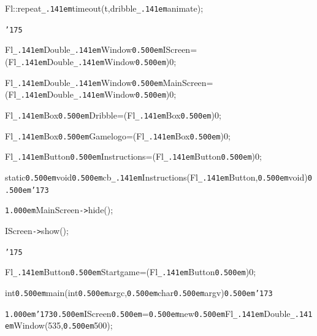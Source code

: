 \documentclass[12pt]{article}
\begin{document}
\noindent
{}Fl::repeat{\tt\_\kern.141em}timeout(t,dribble{\tt\_\kern.141em}animate);

\noindent
{}{\tt\char'175}

\noindent
{}\hfill

\noindent
{}Fl{\tt\_\kern.141em}Double{\tt\_\kern.141em}Window{\tt\mc \kern0.500em}{\tt *}IScreen=(Fl{\tt\_\kern.141em}Double{\tt\_\kern.141em}Window{\tt\mc \kern0.500em}{\tt *})0;

\noindent
{}\hfill

\noindent
{}Fl{\tt\_\kern.141em}Double{\tt\_\kern.141em}Window{\tt\mc \kern0.500em}{\tt *}MainScreen=(Fl{\tt\_\kern.141em}Double{\tt\_\kern.141em}Window{\tt\mc \kern0.500em}{\tt *})0;

\noindent
{}\hfill

\noindent
{}Fl{\tt\_\kern.141em}Box{\tt\mc \kern0.500em}{\tt *}Dribble=(Fl{\tt\_\kern.141em}Box{\tt\mc \kern0.500em}{\tt *})0;

\noindent
{}\hfill

\noindent
{}Fl{\tt\_\kern.141em}Box{\tt\mc \kern0.500em}{\tt *}Gamelogo=(Fl{\tt\_\kern.141em}Box{\tt\mc \kern0.500em}{\tt *})0;

\noindent
{}\hfill

\noindent
{}Fl{\tt\_\kern.141em}Button{\tt\mc \kern0.500em}{\tt *}Instructions=(Fl{\tt\_\kern.141em}Button{\tt\mc \kern0.500em}{\tt *})0;

\noindent
{}\hfill

\noindent
{}static{\tt\mc \kern0.500em}void{\tt\mc \kern0.500em}cb{\tt\_\kern.141em}Instructions(Fl{\tt\_\kern.141em}Button{\tt *},{\tt\mc \kern0.500em}void{\tt *}){\tt\mc \kern0.500em}{\tt\char'173}

\noindent
{}{\tt\mc \kern1.000em}MainScreen{\tt -}{\tt >}hide();

\noindent
{}IScreen{\tt -}{\tt >}show();

\noindent
{}{\tt\char'175}

\noindent
{}\hfill

\noindent
{}Fl{\tt\_\kern.141em}Button{\tt\mc \kern0.500em}{\tt *}Startgame=(Fl{\tt\_\kern.141em}Button{\tt\mc \kern0.500em}{\tt *})0;

\noindent
{}\hfill

\noindent
{}int{\tt\mc \kern0.500em}main(int{\tt\mc \kern0.500em}argc,{\tt\mc \kern0.500em}char{\tt\mc \kern0.500em}{\tt *}{\tt *}argv){\tt\mc \kern0.500em}{\tt\char'173}

\noindent
{}{\tt\mc \kern1.000em}{\tt\char'173}{\tt\mc \kern0.500em}IScreen{\tt\mc \kern0.500em}={\tt\mc \kern0.500em}new{\tt\mc \kern0.500em}Fl{\tt\_\kern.141em}Double{\tt\_\kern.141em}Window(535,{\tt\mc \kern0.500em}500);
\end{document}
